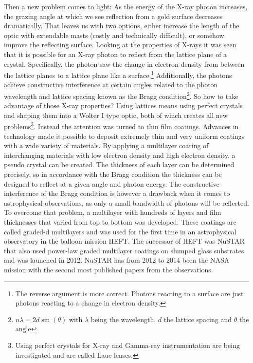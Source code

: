 Then a new problem comes to light: As the energy of the X-ray photon increases, the grazing angle at which we see reflection from a gold surface decreases dramatically. That leaves us with two options, either increase the length of the optic with extendable masts (costly and technically difficult), or somehow improve the reflecting surface. Looking at the properties of X-rays it was seen that it is possible for an X-ray photon to reflect from the lattice plane of a crystal. Specifically, the photon saw the change in electron density from between the lattice planes to a lattice plane like a surface.\footnote{The reverse argument is more correct. Photons reacting to a surface are just photons reacting to a change in electron density.} Additionally, the photons achieve constructive interference at certain angles related to the photon wavelength and lattice spacing known as the Bragg condition\footnote{$n\lambda=2d\sin(\theta)$ with $\lambda$ being the wavelength, $d$ the lattice spacing and $\theta$ the angle}. So how to take advantage of those X-ray properties? Using lattices means using perfect crystals and shaping them into a Wolter I type optic, both of which creates all new problems\footnote{Using perfect crystals for X-ray and Gamma-ray instrumentation are being investigated and are called Laue lenses\cite{Lund:1992kc,Barriere:2014dj,Barriere:2009cm}.}. Instead the attention was turned to thin film coatings. Advances in technology made it possible to deposit extremely thin and very uniform coatings with a wide variety of materials. By applying a multilayer coating of interchanging materials with low electron density and high electron density, a pseudo crystal can be created. The thickness of each layer can be determined precisely, so in accordance with the Bragg condition the thickness can be designed to reflect at a given angle and photon energy. The constructive interference of the Bragg condition is however a drawback when it comes to astrophysical observations, as only a small bandwidth of photons will be reflected. To overcome that problem, a multilayer with hundreds of layers and film thicknesses that varied from top to bottom was developed. These coatings are called graded-d multilayers and was used for the first time in an astrophysical observatory in the balloon mission HEFT\cite{Koglin:2004tr,Madsen:2003te,Jensen:2002tf}. The successor of HEFT was NuSTAR\cite{Harrison:2013wl,Harrison:2010gu,Harrison:2005wa} that also used power-law graded multilayer coatings on slumped glass substrates\cite{Christensen:2011wg,Brejnholt2012} and was launched in 2012. NuSTAR has from 2012 to 2014 been the NASA mission with the second most published papers from the observations.


